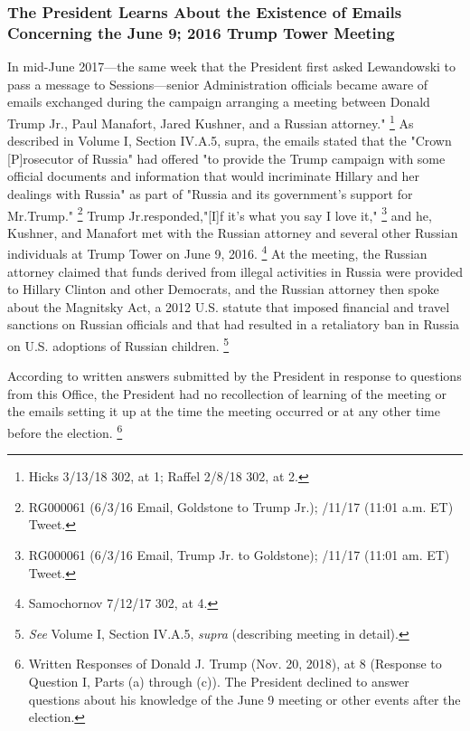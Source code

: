 \subsubsection{The President Learns About the Existence of Emails Concerning the June 9; 2016 Trump Tower Meeting}

In mid-June 2017—the same week that the President first asked Lewandowski to pass a message to Sessions—senior Administration officials became aware of emails exchanged during the campaign arranging a meeting between Donald Trump Jr., Paul Manafort, Jared Kushner, and a Russian attorney."%
\footnote{Hicks 3/13/18 302, at 1;
Raffel 2/8/18 302, at 2.}
As described in Volume I, Section IV.A.5, supra, the emails stated that the "Crown [P]rosecutor of Russia" had offered "to provide the Trump campaign with some official documents and information that would incriminate Hillary and her dealings with Russia" as part of "Russia and its government's support for Mr.Trump."%
\footnote{RG000061 (6/3/16 Email, Goldstone to Trump Jr.);
/11/17 (11:01 a.m. ET) Tweet.}
Trump Jr.responded,"[I]f it's what you say I love it,"%
\footnote{RG000061 (6/3/16 Email, Trump Jr. to Goldstone);
/11/17 (11:01 am. ET) Tweet.}
and he, Kushner, and Manafort met with the Russian attorney and several other Russian individuals at Trump Tower on June 9, 2016.%
\footnote{Samochornov 7/12/17 302, at 4.}
At the meeting, the Russian attorney claimed that funds derived from illegal activities in Russia were provided to Hillary Clinton and other Democrats, and the Russian attorney then spoke about the Magnitsky Act, a 2012 U.S. statute that imposed financial and travel sanctions on Russian officials and that had resulted in a retaliatory ban in Russia on U.S. adoptions of Russian children.%
\footnote{\textit{See} Volume I, Section IV.A.5, \textit{supra} (describing meeting in detail).}

According to written answers submitted by the President in response to questions from this Office, the President had no recollection of learning of the meeting or the emails setting it up at the time the meeting occurred or at any other time before the election.%
\footnote{Written Responses of Donald J. Trump (Nov. 20, 2018), at 8 (Response to Question I, Parts (a) through (c)).
The President declined to answer questions about his knowledge of the June 9 meeting or other events after the election.}

